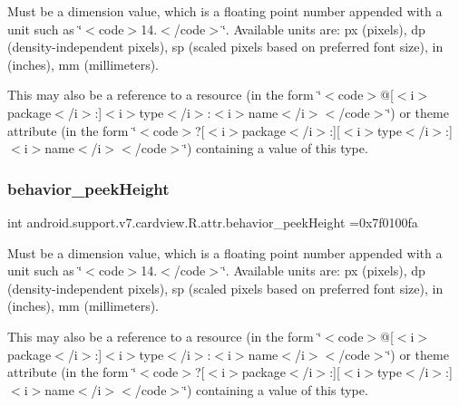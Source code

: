 Must be a dimension value, which is a floating point number appended with a unit such as \char`\"{}$<$code$>$14.\+5sp$<$/code$>$\char`\"{}. Available units are\+: px (pixels), dp (density-\/independent pixels), sp (scaled pixels based on preferred font size), in (inches), mm (millimeters). 

This may also be a reference to a resource (in the form \char`\"{}$<$code$>$@\mbox{[}$<$i$>$package$<$/i$>$\+:\mbox{]}$<$i$>$type$<$/i$>$\+:$<$i$>$name$<$/i$>$$<$/code$>$\char`\"{}) or theme attribute (in the form \char`\"{}$<$code$>$?\mbox{[}$<$i$>$package$<$/i$>$\+:\mbox{]}\mbox{[}$<$i$>$type$<$/i$>$\+:\mbox{]}$<$i$>$name$<$/i$>$$<$/code$>$\char`\"{}) containing a value of this type. \mbox{\label{classandroid_1_1support_1_1v7_1_1cardview_1_1R_1_1attr_a31bb0e81ff71fbe4d22eecc92e1d48ce}} 
\subsubsection{\texorpdfstring{behavior\+\_\+peek\+Height}{behavior\_peekHeight}}
{\footnotesize\ttfamily int android.\+support.\+v7.\+cardview.\+R.\+attr.\+behavior\+\_\+peek\+Height =0x7f0100fa\hspace{0.3cm}{\ttfamily [static]}}

Must be a dimension value, which is a floating point number appended with a unit such as \char`\"{}$<$code$>$14.\+5sp$<$/code$>$\char`\"{}. Available units are\+: px (pixels), dp (density-\/independent pixels), sp (scaled pixels based on preferred font size), in (inches), mm (millimeters). 

This may also be a reference to a resource (in the form \char`\"{}$<$code$>$@\mbox{[}$<$i$>$package$<$/i$>$\+:\mbox{]}$<$i$>$type$<$/i$>$\+:$<$i$>$name$<$/i$>$$<$/code$>$\char`\"{}) or theme attribute (in the form \char`\"{}$<$code$>$?\mbox{[}$<$i$>$package$<$/i$>$\+:\mbox{]}\mbox{[}$<$i$>$type$<$/i$>$\+:\mbox{]}$<$i$>$name$<$/i$>$$<$/code$>$\char`\"{}) containing a value of this type. \mbox{\label{classandroid_1_1support_1_1v7_1_1cardview_1_1R_1_1attr_a497f728b369f40e88879fcf873233148}} 
